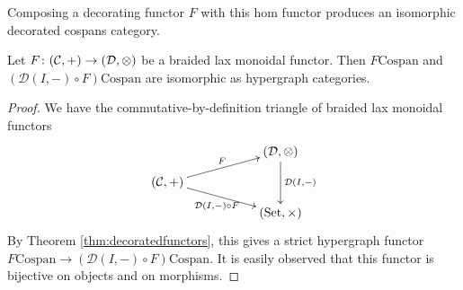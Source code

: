 Composing a decorating functor $F$ with this hom functor produces an isomorphic
decorated cospans category.

\begin{proposition} \label{prop.setdecorations}
  Let $F{\colon} (\mathcal C, +) \to (\mathcal D, \otimes)$ be a braided lax
  monoidal functor. Then $F\mathrm{Cospan}$ and $(\mathcal D(I,-)\circ
  F)\mathrm{Cospan}$ are isomorphic as hypergraph categories.
\end{proposition}
\begin{proof}
  We have the commutative-by-definition triangle of braided lax monoidal
  functors
  \[
    \xymatrixrowsep{2ex}
    \xymatrix{
      && (\mathcal D,\otimes) \ar[dd]^{\mathcal D(I,-)} \\
      (\mathcal C,+) \ar[urr]^{F} \ar[drr]_{\mathcal D(I,-)\circ F} \\
      && (\Set, \times)
    }
  \]
  By Theorem \ref{thm:decoratedfunctors}, this gives a strict hypergraph functor
  $F\mathrm{Cospan} \to (\mathcal D(I,-)\circ F)\mathrm{Cospan}$. It is easily
  observed that this functor is bijective on objects and on morphisms. 
\end{proof}

